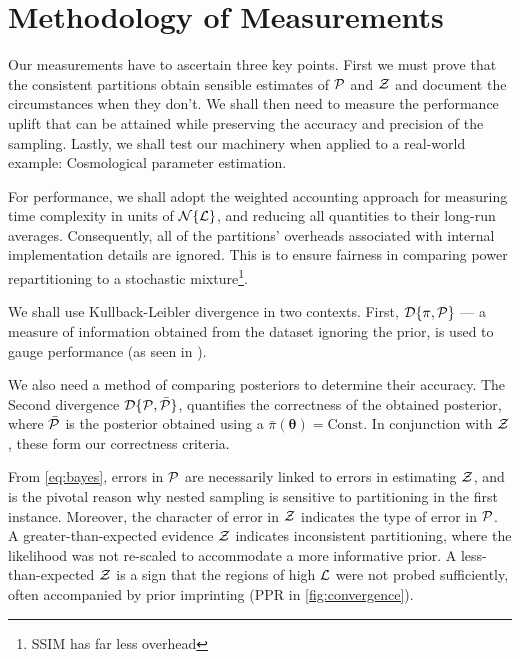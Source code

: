 \documentclass[draft,usenatbib]{mnras}
\begin{document}
\section{Methodology of Measurements}
\label{sec:org46183d2}
Our measurements have to ascertain three key points. First we must
prove that the consistent partitions obtain sensible estimates of
\({\cal P}\) and \({\cal Z}\) and document the circumstances when they
don't. We shall then need to measure the performance uplift that can
be attained while preserving the accuracy and precision of the
sampling. Lastly, we shall test our machinery when applied to a
real-world example: Cosmological parameter estimation.

For performance, we shall adopt the weighted accounting approach
\citep{Cormen} for measuring time complexity in units of
\({\cal N}\{{\cal L}\}\), and reducing all quantities to their
long-run averages. Consequently, all of the partitions' overheads
associated with internal implementation details are ignored. This is
to ensure fairness in comparing power repartitioning to a stochastic
mixture\footnote{SSIM has far less overhead}.

We shall use Kullback-Leibler divergence in two contexts. First,
\({\cal D}\{\pi, {\cal P}\}\) --- a measure of information obtained from
the dataset ignoring the prior, is used to gauge performance (as seen
in ).

We also need a method of comparing posteriors to determine their
accuracy. The Second divergence
\({\cal D}\{ {\cal P}, \bar{\cal P} \}\), quantifies the correctness of
the obtained posterior, where \(\bar{\cal P}\) is the posterior obtained
using a \(\bar{\pi}(\bm{\theta}) = \text{Const}\). In conjunction with
\({\cal Z}\), these form our correctness criteria.

From \cref{eq:bayes}, errors in \({\cal P}\) are necessarily linked to
errors in estimating \({\cal Z}\), and is the pivotal reason why nested
sampling is sensitive to partitioning in the first instance. Moreover,
the character of error in \({\cal Z}\) indicates the type of error in
\({\cal P}\). A greater-than-expected evidence \({\cal Z}\) indicates
inconsistent partitioning, where the likelihood was not re-scaled to
accommodate a more informative prior. A less-than-expected \({\cal Z}\)
is a sign that the regions of high \({\cal L}\) were not probed
sufficiently, often accompanied by prior imprinting (PPR in
\cref{fig:convergence}).
\end{document}

